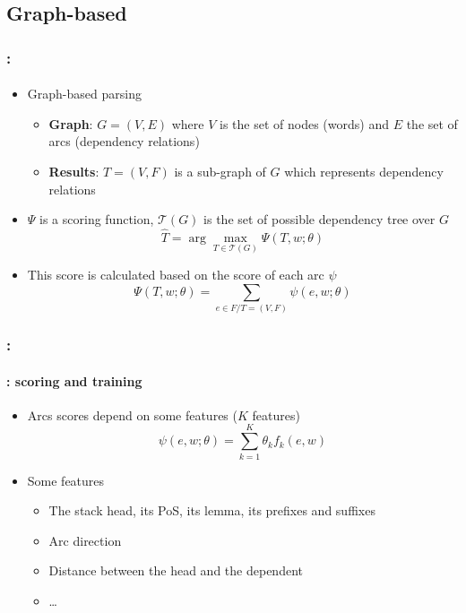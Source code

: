 \documentclass[xcolor=table]{beamer}
\begin{document}
\subsection{Graph-based}

\begin{frame}
	\frametitle{\insertshortsubtitle: \insertsection}
	\framesubtitle{\insertsubsection}

	\begin{minipage}{.6\textwidth}
		\begin{itemize}
			\item Graph-based parsing
			\begin{itemize}
				\item \textbf{Graph}: $G = (V, E)$ where $V$ is the set of nodes (words) and $E$ the set of arcs (dependency relations)
				\item \textbf{Results}: $T = (V, F)$ is a sub-graph of $G$ which represents dependency relations
			\end{itemize}
		\end{itemize}
	\end{minipage}
	\begin{minipage}{.38\textwidth}
	\end{minipage}
	
	\begin{itemize}
		\item $\Psi$ is a scoring function, $ \mathcal{T}(G) $ is the set of possible dependency tree over $G$
		\[ \hat{T} = \arg\max\limits_{T \in \mathcal{T}(G)} \Psi(T, w; \theta) \]
		\item This score is calculated based on the score of each arc $\psi$
		\[ \Psi(T, w; \theta) = \sum_{e \in F / T = (V, F)} \psi(e, w; \theta) \]
	\end{itemize}

\end{frame}

\begin{frame}
	\frametitle{\insertshortsubtitle: \insertsection}
	\framesubtitle{\insertsubsection: scoring and training}

	\begin{itemize}
		\item Arcs scores depend on some features ($K$ features)
		\[ \psi(e, w; \theta) = \sum_{k = 1}^{K} \theta_k f_k(e, w)  \]
		
		\item Some features
		\begin{itemize}
			\item The stack head, its PoS, its lemma, its prefixes and suffixes
			\item Arc direction
			\item Distance between the head and the dependent
			\item \ldots
		\end{itemize}	
	\end{itemize}

\end{frame}
\end{document}
